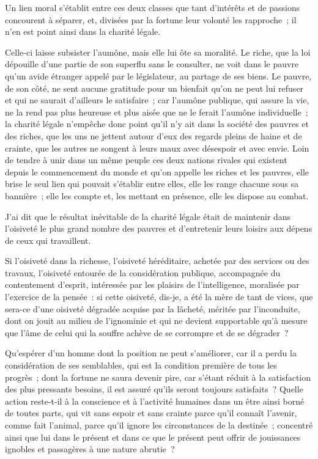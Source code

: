 \documentclass[twoside]{book} %
\begin{document}
\noindent Un lien moral s’établit entre ces deux classes que tant d’intérêts et de passions concourent à séparer, et, divisées par la fortune leur volonté les rapproche ; il n’en est point ainsi dans la charité légale.\par
Celle-ci laisse subsister l’aumône, mais elle lui ôte sa moralité. Le riche, que la loi dépouille d’une partie de son superflu sans le consulter, ne voit dans le pauvre qu’un avide étranger appelé par le législateur, au partage de ses biens. Le pauvre, de son côté, ne sent aucune gratitude pour un bienfait qu’on ne peut lui refuser et qui ne saurait d’ailleurs le satisfaire ; car l’aumône publique, qui assure la vie, ne la rend pas plus heureuse et plus aisée que ne le ferait l’aumône individuelle ; la charité légale n’empêche donc point qu’il n’y ait dans la société des pauvres et des riches, que les uns ne jettent autour d’eux des regards pleins de haine et de crainte, que les autres ne songent à leurs maux avec désespoir et avec envie. Loin de tendre à unir dans un même peuple ces deux nations rivales qui existent depuis le commencement du monde et qu’on appelle les riches et les pauvres, elle brise le seul lien qui pouvait s’établir entre elles, elle les range chacune sous sa bannière ; elle les compte et, les mettant en présence, elle les dispose au combat.\par
\bigbreak
\noindent J'ai dit que le résultat inévitable de la charité légale était de maintenir dans l’oisiveté le plus grand nombre des pauvres et d’entretenir leurs loisirs aux dépens de ceux qui travaillent.\par
Si l’oisiveté dans la richesse, l’oisiveté héréditaire, achetée par des services ou des travaux, l’oisiveté entourée de la considération publique, accompagnée du contentement d’esprit, intéressée par les plaisirs de l’intelligence, moralisée par l’exercice de la pensée : si cette oisiveté, dis-je, a été la mère de tant de vices, que sera-ce d’une oisiveté dégradée acquise par la lâcheté, méritée par l’inconduite, dont on jouit au milieu de l’ignominie et qui ne devient supportable qu’à mesure que l’âme de celui qui la souffre achève de se corrompre et de se dégrader ?\par
Qu'espérer d’un homme dont la position ne peut s’améliorer, car il a perdu la considération de ses semblables, qui est la condition première de tous les progrès ; dont la fortune ne saura devenir pire, car s’étant réduit à la satisfaction des plus pressants besoins, il est assuré qu’ils seront toujours satisfaits ? Quelle action reste-t-il à la conscience et à l’activité humaines dans un être ainsi borné de toutes parts, qui vit sans espoir et sans crainte parce qu’il connaît l’avenir, comme fait l’animal, parce qu’il ignore les circonstances de la destinée ; concentré ainsi que lui dans le présent et dans ce que le présent peut offrir de jouissances ignobles et passagères à une nature abrutie ?\par
\end{document}
